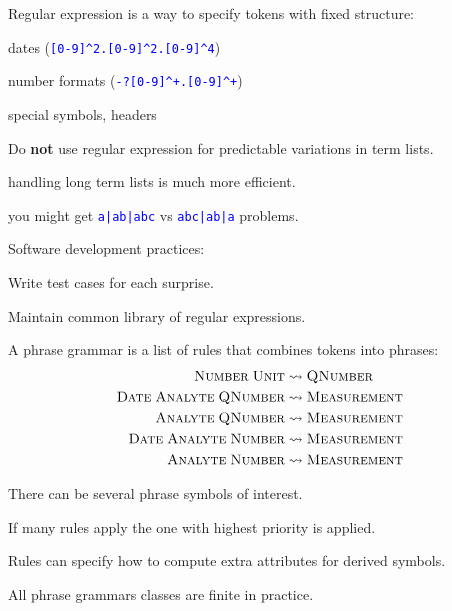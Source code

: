 \documentclass[landscape,footrule]{foils}
\begin{document}

\renewcommand{\verb}{\collectverb{\color{red}}}
Regular expression is a way to specify tokens with fixed structure:
\begin{triangles}
\item dates (\textcolor{blue}{\texttt{[0-9]\^{}2.[0-9]\^{}2.[0-9]\^{}4}}) 
\item number formats (\textcolor{blue}{\texttt{-?[0-9]\^{}+.[0-9]\^{}+}}) 
\item special symbols, headers
\end{triangles} \vspace*{3ex}

Do \textbf{not} use regular expression for predictable variations in term lists.
\begin{triangles}
\item handling long term lists is much more efficient.  
\item you might get \textcolor{blue}{\texttt{a|ab|abc}} vs \textcolor{blue}{\texttt{abc|ab|a}} problems.
\end{triangles} \vspace*{3ex}

Software development practices:
\begin{triangles}
\item Write test cases for each surprise. 
\item Maintain common library of regular expressions.    
\end{triangles}   



A phrase grammar is a list of rules that combines tokens into phrases:
\begin{align*}
\textsc{Number}\; \textsc{Unit} &\leadsto \textsc{QNumber}\\
\textsc{Date}\;\textsc{Analyte}\; \textsc{QNumber} &\leadsto \textsc{Measurement}\\
\textsc{Analyte}\; \textsc{QNumber} &\leadsto \textsc{Measurement}\\
\textsc{Date}\; \textsc{Analyte}\; \textsc{Number} &\leadsto \textsc{Measurement}\\
\textsc{Analyte}\; \textsc{Number} &\leadsto \textsc{Measurement}
\end{align*} 

\begin{triangles}
\item There can be several phrase symbols of interest.
\item If many rules apply the one with highest priority is applied. 
\item Rules can specify how to compute extra attributes for derived symbols. 
\item All phrase grammars classes are finite in practice. 
\end{triangles}
\end{document}
